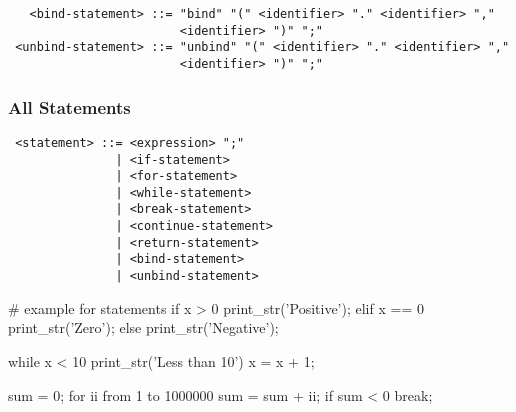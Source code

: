 \begin{verbatim}
   <bind-statement> ::= "bind" "(" <identifier> "." <identifier> ","
                        <identifier> ")" ";"
 <unbind-statement> ::= "unbind" "(" <identifier> "." <identifier> ","
                        <identifier> ")" ";"
\end{verbatim}

\subsubsection{All Statements}

\begin{verbatim}
 <statement> ::= <expression> ";"
               | <if-statement>
               | <for-statement>
               | <while-statement>
               | <break-statement>
               | <continue-statement>
               | <return-statement>
               | <bind-statement>
               | <unbind-statement>
\end{verbatim}

\begin{mylistingn}
# example for statements
if x > 0
{
  print_str('Positive');
}
elif x == 0
{
  print_str('Zero');
}
else
{
  print_str('Negative');
}

while x < 10
{
  print_str('Less than 10')
  x = x + 1;
}

sum = 0;
for ii from 1 to 1000000
{
  sum = sum + ii;
  if sum < 0
  {
    break;
  }
}
\end{mylistingn}


